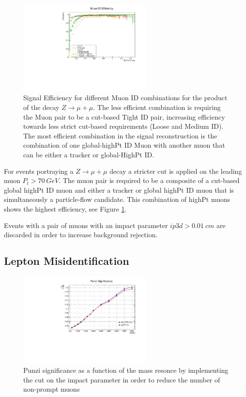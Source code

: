 \begin{figure}[tph]
  \centering
  \includegraphics[width=0.6\textwidth]{fig/LeptonIDStudies/MuonIDEfficiency.pdf}
  \caption{Signal Efficiency for different Muon ID combinations for the product of
    the decay $Z\rightarrow\mu+\mu$. The less efficient combination is requiring
    the Muon pair to be a cut-based Tight ID pair, increasing efficiency towards less
    strict cut-based requirements (Loose and Medium ID). The most efficient combination in
    the signal reconstruction is the combination of one global-highPt ID Muon
    with another muon that can be either a tracker or global-HighPt ID.}
  \label{fig:MuonIDEfficiency}
\end{figure}

For events portraying a $Z\rightarrow\mu+\mu$ decay a stricter cut is applied on the
leading muon $P_{t}>70~GeV$. The muon pair is required to be a composite of a
cut-based global highPt ID muon and either a tracker or global highPt ID muon
that is simultaneously a particle-flow candidate. This combination of highPt
muons shows the highest efficiency, see Figure \ref{fig:MuonIDEfficiency}.

Events with a pair of muons with an impact parameter $ip3d>0.01~cm$ are
discarded in order to increase background rejection.

\subsection{Lepton Misidentification}


\begin{figure}[tph]
  \centering
  \includegraphics[width=0.6\textwidth]{fig/PunziTest_Ip3DCut.pdf}
  \caption{Punzi significance as a function of the mass resonce by implementing
    the cut on the impact parameter in order to reduce the number of non-prompt
    muons}
  \label{fig:Punzi_Ip3DCut}
\end{figure}


